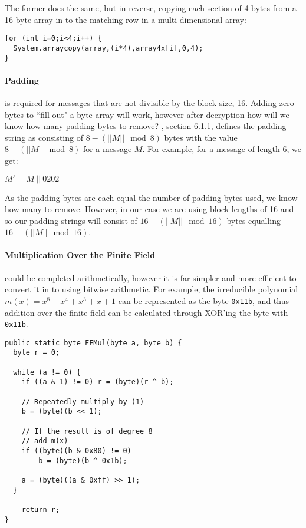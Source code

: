     The former does the same, but in reverse, copying each section of 4 bytes from a 16-byte array in to the matching row in a multi-dimensional array: \\
    
    \begin{lstlisting}
for (int i=0;i<4;i++) {
  System.arraycopy(array,(i*4),array4x[i],0,4);
}
\end{lstlisting}
    
    \paragraph{Padding} is required for messages that are not divisible by the block size, 16. Adding zero bytes to ``fill out" a byte array will work, however after decryption how will we know how many padding bytes to remove? \cite{Kaliski:2000aa}, section 6.1.1, defines the padding string as consisting of $8-(||M|| \mod 8)$ bytes with the value $8-(||M|| \mod 8)$ for a message $M$. For example, for a message of length 6, we get:
    
    \begin{center}
      $M' = M \ || \ 0202$
    \end{center}
    
    As the padding bytes are each equal the number of padding bytes used, we know how many to remove. However, in our case we are using block lengths of 16 and so our padding strings will consist of $16-(||M|| \mod 16)$ bytes equalling $16-(||M|| \mod 16)$.
    
    \paragraph{Multiplication Over the Finite Field} could be completed arithmetically, however it is far simpler and more efficient to convert it in to using bitwise arithmetic. For example, the irreducible polynomial $m(x) = x^8 + x^4 + x^3 + x + 1$ can be represented as the byte \verb!0x11b!, and thus addition over the finite field can be calculated through XOR'ing the byte with \verb!0x11b!. \\
    
    \begin{lstlisting}
public static byte FFMul(byte a, byte b) {
  byte r = 0;
  
  while (a != 0) {
    if ((a & 1) != 0) r = (byte)(r ^ b);
    
    // Repeatedly multiply by (1)
    b = (byte)(b << 1);
    
    // If the result is of degree 8
    // add m(x)
    if ((byte)(b & 0x80) != 0)
        b = (byte)(b ^ 0x1b);
    
    a = (byte)((a & 0xff) >> 1);
  }
      
    return r;
}
\end{lstlisting}
  
